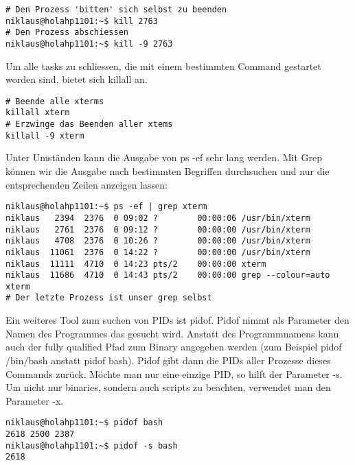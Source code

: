 \begin{lstlisting}[frame=single]
# Den Prozess 'bitten' sich selbst zu beenden
niklaus@holahp1101:~$ kill 2763
# Den Prozess abschiessen
niklaus@holahp1101:~$ kill -9 2763
\end{lstlisting}
Um alle tasks zu schliessen, die mit einem bestimmten Command gestartet worden sind, bietet sich killall an.
\begin{lstlisting}[frame=single]
# Beende alle xterms
killall xterm
# Erzwinge das Beenden aller xtems
killall -9 xterm
\end{lstlisting}
Unter Umst\"anden kann die Ausgabe von ps -ef sehr lang werden. Mit Grep k\"onnen wir die Ausgabe nach bestimmten Begriffen durchsuchen und nur die entsprechenden Zeilen anzeigen lassen:
\begin{lstlisting}[frame=single]
niklaus@holahp1101:~$ ps -ef | grep xterm
niklaus   2394  2376  0 09:02 ?        00:00:06 /usr/bin/xterm
niklaus   2761  2376  0 09:12 ?        00:00:00 /usr/bin/xterm
niklaus   4708  2376  0 10:26 ?        00:00:00 /usr/bin/xterm
niklaus  11061  2376  0 14:22 ?        00:00:00 /usr/bin/xterm
niklaus  11111  4710  0 14:23 pts/2    00:00:00 xterm
niklaus  11686  4710  0 14:43 pts/2    00:00:00 grep --colour=auto xterm
# Der letzte Prozess ist unser grep selbst
\end{lstlisting}
Ein weiteres Tool zum suchen von PIDs ist pidof. Pidof nimmt als Parameter den Namen des Programmes das gesucht wird. Anstatt des Programmnamens kann auch der fully qualified Pfad zum Binary angegeben werden (zum Beispiel pidof /bin/bash anstatt pidof bash). Pidof gibt dann die PIDs aller Prozesse dieses Commands zur\"uck. M\"ochte man nur eine einzige PID, so hilft der Parameter -s. Um nicht nur binaries, sondern auch scripts zu beachten, verwendet man den Parameter -x.
\begin{lstlisting}[frame=single]
niklaus@holahp1101:~$ pidof bash
2618 2500 2387
niklaus@holahp1101:~$ pidof -s bash
2618
\end{lstlisting}
